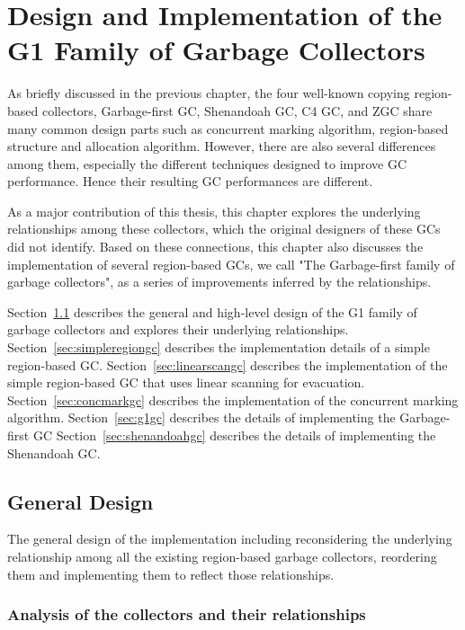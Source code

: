 \chapter{Design and Implementation of the G1 Family of Garbage Collectors}
\label{cha:implementation}

As briefly discussed in the previous chapter, the four well-known copying region-based collectors, Garbage-first GC, Shenandoah GC, C4 GC, and
ZGC share many common design parts such as concurrent marking algorithm, region-based
structure and allocation algorithm. However, there are also several differences
among them, especially the different techniques designed to improve GC performance.
Hence their resulting GC performances are different.

As a major contribution of this thesis, this chapter explores the underlying relationships
among these collectors, which the original designers of these GCs did not identify.
Based on these connections, this chapter also discusses the implementation
of several region-based GCs, we call "The Garbage-first family of garbage collectors",
as a series of improvements inferred by the relationships.

Section~\ref{sec:generaldesign} describes the general and high-level design of the
G1 family of garbage collectors and explores their underlying relationships.
Section~\ref{sec:simpleregiongc} describes the implementation details of a simple region-based GC.
Section~\ref{sec:linearscangc} describes the implementation of the simple region-based GC that uses linear scanning for evacuation.
Section~\ref{sec:concmarkgc} describes the implementation of the concurrent marking algorithm.
Section~\ref{sec:g1gc} describes the details of implementing the Garbage-first GC
Section~\ref{sec:shenandoahgc} describes the details of implementing the Shenandoah GC.



\section{General Design}
\label{sec:generaldesign}

The general design of the implementation including reconsidering the underlying
relationship among all the existing region-based garbage collectors, reordering them
and implementing them to reflect those relationships.

\subsection{Analysis of the collectors and their relationships}

